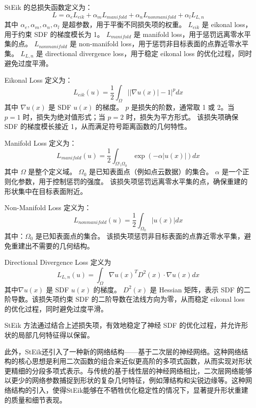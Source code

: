 \documentclass{xduugthesis}
\begin{document}
StEik 的总损失函数定义为：
\begin{equation}
L = \alpha_e L_{eik} + \alpha_m L_{manifold} + \alpha_n L_{nonmanifold} + \alpha_l L_{L,n}
\end{equation}
其中
 \(\alpha_e, \alpha_m, \alpha_n, \alpha_l\) 是超参数，用于平衡不同损失项的权重。
\(L_{eik}\) 是 eikonal loss，用于约束 SDF 的梯度模长为 1。
  \(L_{manifold}\) 是 manifold loss，用于惩罚远离零水平集的点。
  \(L_{nonmanifold}\) 是 non-manifold loss，用于惩罚非目标表面的点靠近零水平集。
\(L_{L,n}\) 是 directional divergence loss，用于稳定 eikonal loss 的优化过程，同时避免过度平滑。

Eikonal Loss 定义为：
\begin{equation}
L_{eik}(u) = \frac{1}{2} \int_{\Omega} \left| \left| \nabla u(x) \right| - 1 \right|^p dx
\end{equation}
其中
\(\nabla u(x)\) 是 SDF \(u(x)\) 的梯度。
\(p\) 是损失的阶数，通常取 1 或 2。当 \(p = 1\) 时，损失为绝对值形式；当 \(p = 2\) 时，损失为平方形式。
该损失项确保 SDF 的梯度模长接近 1，从而满足符号距离函数的几何特性。

Manifold Loss 定义为：
\begin{equation}
L_{manifold}(u) = \frac{1}{2} \int_{\Omega \setminus \Omega_0} \exp(-\alpha |u(x)|) dx
\end{equation}
其中
\(\Omega\) 是整个定义域。
\(\Omega_0\) 是已知表面点（例如点云数据）的集合。
\(\alpha\) 是一个正则化参数，用于控制惩罚的强度。
该损失项惩罚远离零水平集的点，确保重建的形状集中在目标表面附近。

Non-Manifold Loss 定义为：
\begin{equation}
L_{nonmanifold}(u) = \frac{1}{2} \int_{\Omega_0} |u(x)| dx
\end{equation}
其中：\(\Omega_0\) 是已知表面点的集合。
该损失项惩罚非目标表面的点靠近零水平集，避免重建出不需要的几何结构。

Directional Divergence Loss 定义为
\begin{equation}
L_{L,n}(u) = \int_{\Omega} \nabla u(x)^T D^2(x) \cdot \nabla u(x) dx
\end{equation}
其中\(\nabla u(x)\) 是 SDF \(u(x)\) 的梯度。
\(D^2(x)\) 是 Hessian 矩阵，表示 SDF 的二阶导数。该损失项约束 SDF 的二阶导数在法线方向为零，从而稳定 eikonal loss 的优化过程，同时避免过度平滑。

StEik 方法通过结合上述损失项，有效地稳定了神经 SDF 的优化过程，并允许形状的局部几何特征得以保留。

此外，StEik还引入了一种新的网络结构——基于二次层的神经网络。这种网络结构的核心思想是利用二次函数的组合来近似更高阶的多项式函数，从而实现对形状更精细的分段多项式表示。与传统的基于线性层的神经网络相比，二次层网络能够以更少的网络参数捕捉到形状的复杂几何特征，例如薄结构和尖锐边缘等。这种网络结构的引入，使得StEik能够在不牺牲优化稳定性的情况下，显著提升形状重建的质量和细节表现。
\end{document}
